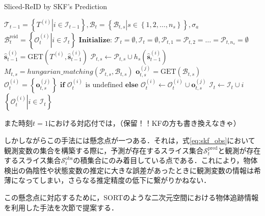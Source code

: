     \begin{algorithm}[t]
        \caption{Sliced-ReID by SKF's Prediction}
        \label{alg:skf_matching}
        \begin{algorithmic}[1]
            \REQUIRE $\mathcal{T}_{t-1} = \left\{ \left. T^{(i)}\right| i \in \mathcal{I}_{t-1}\right\} , \mathcal{B}_t = \left\{\left. \mathcal{B}_{t,s} \right| s \in \left\{1,2,\dots,n_s\right\}\right\},\sigma_a$ 
            \ENSURE $\mathcal{B}_t^{\text{reid}} = \left\{\left.\mathcal{O}_t^{(i)}\right|i \in \mathcal{I}_t\right\}$
            \STATE $\textbf{Initialize: } \mathcal{T}_t = \emptyset, \mathcal{I}_t = \emptyset,\mathcal{P}_{t,1} = \mathcal{P}_{t,2}=\dots=\mathcal{P}_{t,n_s} = \emptyset$
                    \STATE $\hat{\bm{s}}_{t-1}^{(i)} = \text{GET}(T^{(i)}, \hat{\bm{s}}_{t-1}^{(i)})$
                    \STATE $\mathcal{P}_{t,s} \leftarrow \mathcal{P}_{t,s} \cup h_s(\hat{\bm{s}}_{t-1}^{(i)})$
                \ENDFOR
            \ENDFOR
                \STATE $M_{t,s} = hungarian\_matching(\mathcal{P}_{t,s}, \mathcal{B}_{t,s})$
                    \STATE $\bm{o}_{t,s}^{(j)} = \text{GET}(\mathcal{B}_{t,s})$
                    \STATE $\mathcal{O}_t^{(i)} = \left\{\bm{o}_{t,s}^{(j)}\right\} \textbf{ if } \mathcal{O}_t^{(i)} \text{ is undefined} \textbf{ else } \mathcal{O}_t^{(i)} \leftarrow \mathcal{O}_t^{(i)} \cup \bm{o}_{t,s}^{(j)}$
                    \STATE $\mathcal{I}_t \leftarrow \mathcal{I}_t \cup i$
                \ENDFOR
            \ENDFOR
            \RETURN $\left\{\left.\mathcal{O}_t^{(i)}\right|i \in \mathcal{I}_t\right\}$
        \end{algorithmic}
    \end{algorithm}

    また時刻$t=1$における対応付では，（保留！！KFの方も書き換えなきゃ）
    \par
    しかしながらこの手法には懸念点が一つある．それは，式\ref{eq:skf_obs}において観測変数の集合を構築する際に，予測が存在するスライス集合$\mathcal{S}_t^{\text{pred}}$と観測が存在するスライス集合$\mathcal{S}_t^{\text{obs}}$の積集合にのみ着目している点である．これにより，物体検出の偽陰性や状態変数の推定に大きな誤差があったときに観測変数の情報は希薄になってしまい，さらなる推定精度の低下に繋がりかねない．
    \par
    この懸念点に対応するために，SORTのような二次元空間における物体追跡情報を利用した手法を次節で提案する．

